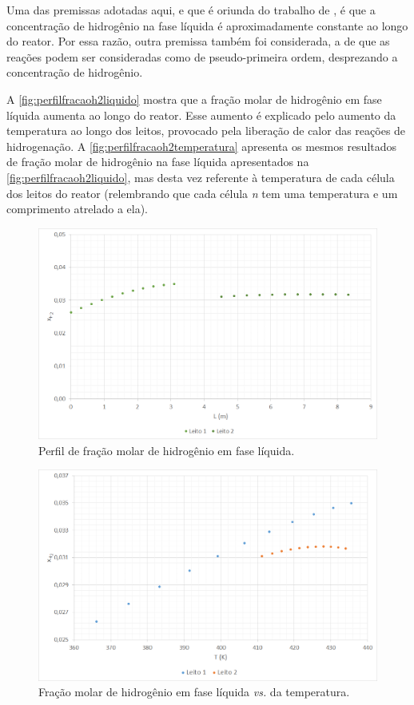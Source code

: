 Uma das premissas adotadas aqui, e que é oriunda do trabalho de
, é que a concentração de hidrogênio na
fase líquida é aproximadamente constante ao longo do reator. Por essa razão,
outra premissa também foi considerada, a de que as reações podem ser
consideradas como de pseudo-primeira ordem, desprezando a concentração de
hidrogênio.

A \autoref{fig:perfilfracaoh2liquido} mostra que a fração molar de hidrogênio em
fase líquida aumenta ao longo do reator. Esse aumento é explicado pelo
aumento da temperatura ao longo dos leitos, provocado pela liberação de calor
das reações de hidrogenação. A \autoref{fig:perfilfracaoh2temperatura} apresenta
os mesmos resultados de fração molar de hidrogênio na fase líquida apresentados
na \autoref{fig:perfilfracaoh2liquido}, mas desta vez referente à temperatura de
cada célula dos leitos do reator (relembrando que cada célula \emph{n} tem uma
temperatura e um comprimento atrelado a ela).

\begin{figure}[htb]
\centering \includegraphics[scale=0.4]{images/Chap4/perfilfracaoh2liquido.png}
\caption{Perfil de fração molar de hidrogênio em fase líquida.}
\label{fig:perfilfracaoh2liquido}
\end{figure}

\begin{figure}[htb]
\centering
\includegraphics[scale=0.4]{images/Chap4/perfilfracaoh2temperatura.png}
\caption{Fração molar de hidrogênio em fase líquida \emph{vs.} da temperatura.}
\label{fig:perfilfracaoh2temperatura}
\end{figure}

